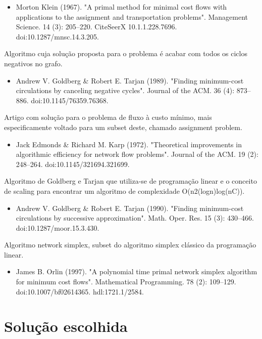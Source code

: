\documentclass[12pt, a4]{article}
\begin{document}
\begin{itemize}
\item Morton Klein (1967). "A primal method for minimal cost flows with
    applications to the assignment and transportation problems". Management
    Science. 14 (3): 205–220. CiteSeerX 10.1.1.228.7696.
    doi:10.1287/mnsc.14.3.205.
\end{itemize}

Algoritmo cuja solução proposta para o problema é acabar com todos os ciclos
negativos no grafo.

\begin{itemize}
\item Andrew V. Goldberg \& Robert E. Tarjan (1989). "Finding minimum-cost
    circulations by canceling negative cycles". Journal of the ACM. 36 (4):
    873–886. doi:10.1145/76359.76368.
\end{itemize}

Artigo com solução para o problema de fluxo à custo mínimo, mais especificamente
voltado para um subset deste, chamado assignment problem.

\begin{itemize}
\item Jack Edmonds \& Richard M. Karp (1972). "Theoretical improvements in
    algorithmic efficiency for network flow problems". Journal of the ACM. 19
    (2): 248–264. doi:10.1145/321694.321699.
\end{itemize}

Algoritmo de Goldberg e Tarjan que utiliza-se de programação linear e o conceito
de scaling para encontrar um algoritmo de complexidade O(n2(logn)log(nC)).

\begin{itemize}
\item Andrew V. Goldberg \& Robert E. Tarjan (1990). "Finding minimum-cost
circulations by successive approximation". Math. Oper. Res. 15 (3): 430–466.
doi:10.1287/moor.15.3.430.
\end{itemize}

Algoritmo network simplex, subset do algoritmo simplex clássico da programação
linear.

\begin{itemize}
\item James B. Orlin (1997). "A polynomial time primal network simplex algorithm
    for minimum cost flows". Mathematical Programming. 78 (2): 109–129.
    doi:10.1007/bf02614365. hdl:1721.1/2584.
\end{itemize}

\section{Solução escolhida}
\end{document}
